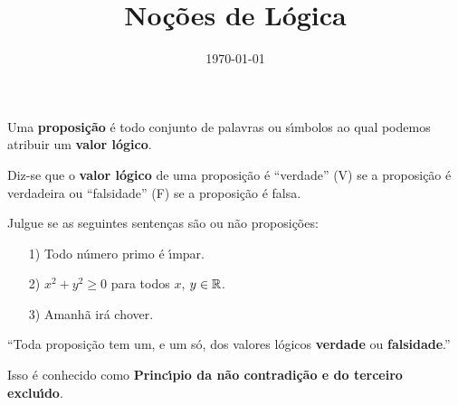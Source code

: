 \documentclass{beamer}
\title{Noções de Lógica}
\author[\autor]{\autor}
\institute[\instituto]{\instituto}
\date{\today}
\begin{document}
    \begin{frame}
        \maketitle
    \end{frame}


    \begin{frame}
        \begin{definicao}
            Uma \textbf{proposi\c{c}\~ao} \'e todo conjunto de palavras ou s{\'\i}mbolos ao qual podemos atribuir um \textbf{valor l\'ogico}.\pause
        \end{definicao}

        \begin{definicao}
            Diz-se que o \textbf{valor l\'ogico} de uma proposi\c{c}\~ao \'e ``verdade'' (V) se a proposi\c{c}\~ao \'e verdadeira ou ``falsidade'' (F) se a proposi\c{c}\~ao \'e falsa.
        \end{definicao}
    \end{frame}

    \begin{frame}
        \begin{exemplos}
            Julgue se as seguintes senten\c{c}as s\~ao ou n\~ao proposi\c{c}\~oes:\pause
            \begin{itemize}
                \item[1)] Todo n\'umero primo \'e {\'\i}mpar.\pause
                \item[2)] $x^2 + y^2 \ge 0$ para todos $x$, $y \in \mathbb{R}$.\pause
                \item[3)] Amanh\~a ir\'a chover.
            \end{itemize}
        \end{exemplos}
    \end{frame}

    \begin{frame}
        \begin{center}
            ``Toda proposi\c{c}\~ao tem um, e um s\'o, dos valores l\'ogicos \textbf{verdade} ou \textbf{falsidade}.''\pause
        \end{center}
        Isso é conhecido como \textbf{Princ{\'\i}pio da n\~ao contradi\c{c}\~ao e do terceiro exclu{\'\i}do}.
    \end{frame}
\end{document}
